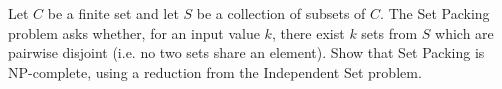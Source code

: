\problem{}
Let $C$ be a finite set and let $S$ be a collection of subsets of $C$.  The Set Packing problem asks whether, for an input value $k$, there exist $k$ sets from $S$ which are pairwise disjoint (i.e. no two sets share an element).  Show that Set Packing is NP-complete, using a reduction from the Independent Set problem.

\solution{}
\newpage